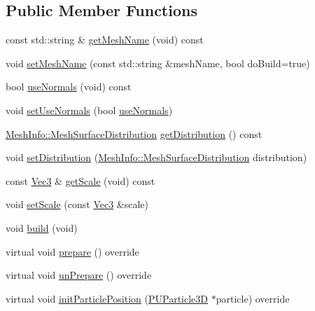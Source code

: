 \subsection*{Public Member Functions}
\begin{DoxyCompactItemize}
\item 
const std\+::string \& \hyperlink{classPUMeshSurfaceEmitter_a82a6e922aa6a05190bbc4f77e2485a3c}{get\+Mesh\+Name} (void) const
\item 
void \hyperlink{classPUMeshSurfaceEmitter_a48ff37dbec592524c2f706d6900cc709}{set\+Mesh\+Name} (const std\+::string \&mesh\+Name, bool do\+Build=true)
\item 
bool \hyperlink{classPUMeshSurfaceEmitter_a912bdee6b699413b072d4a9910f59b1b}{use\+Normals} (void) const
\item 
void \hyperlink{classPUMeshSurfaceEmitter_a688415b477c759993754d5b25957fc78}{set\+Use\+Normals} (bool \hyperlink{classPUMeshSurfaceEmitter_a912bdee6b699413b072d4a9910f59b1b}{use\+Normals})
\item 
\hyperlink{classMeshInfo_aadc99105abbc3bd033e33c6ba512a13b}{Mesh\+Info\+::\+Mesh\+Surface\+Distribution} \hyperlink{classPUMeshSurfaceEmitter_a214f28fc4cf1534a7e586c94c5fc3c6c}{get\+Distribution} () const
\item 
void \hyperlink{classPUMeshSurfaceEmitter_ae5908bb7c27ec91f47b4123a78edda7c}{set\+Distribution} (\hyperlink{classMeshInfo_aadc99105abbc3bd033e33c6ba512a13b}{Mesh\+Info\+::\+Mesh\+Surface\+Distribution} distribution)
\item 
const \hyperlink{classVec3}{Vec3} \& \hyperlink{classPUMeshSurfaceEmitter_a9f9a6a4d1548191680038731d87835e9}{get\+Scale} (void) const
\item 
void \hyperlink{classPUMeshSurfaceEmitter_a029bba66d885414ad457f79c1d82f88b}{set\+Scale} (const \hyperlink{classVec3}{Vec3} \&scale)
\item 
void \hyperlink{classPUMeshSurfaceEmitter_a7447a884e8a62d8d20f4e336f4c6df6e}{build} (void)
\item 
virtual void \hyperlink{classPUMeshSurfaceEmitter_ae4fdbd8c3760b68373ddce24b5d9ab11}{prepare} () override
\item 
virtual void \hyperlink{classPUMeshSurfaceEmitter_a7f222315d8d78d213baa3412d6db3397}{un\+Prepare} () override
\item 
virtual void \hyperlink{classPUMeshSurfaceEmitter_a9696ca685d847e4e3c4f403e66f95ecb}{init\+Particle\+Position} (\hyperlink{structPUParticle3D}{P\+U\+Particle3D} $\ast$particle) override
\item 

\end{DoxyCompactItemize}

